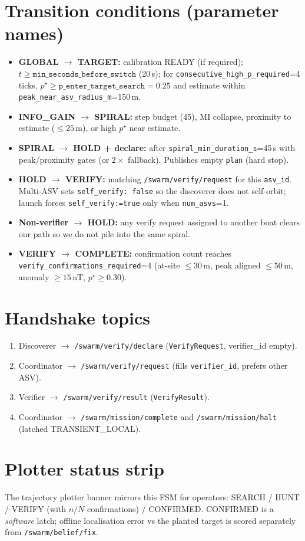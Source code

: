 \section{Transition conditions (parameter names)}
\begin{itemize}[leftmargin=*]
  \item \textbf{GLOBAL $\rightarrow$ TARGET:} calibration READY (if required);
        \(t\ge\texttt{min\_seconds\_before\_switch}\) (20\,s); for
        \texttt{consecutive\_high\_p\_required}=4 ticks,
        \(p^\star\ge\texttt{p\_enter\_target\_search}=0.25\) and estimate within
        \texttt{peak\_near\_asv\_radius\_m}=150\,m.
  \item \textbf{INFO\_GAIN $\rightarrow$ SPIRAL:} step budget (45), MI collapse,
        proximity to estimate (\(\le25\,\mathrm{m}\)), or high \(p^\star\) near estimate.
  \item \textbf{SPIRAL $\rightarrow$ HOLD + declare:} after
        \texttt{spiral\_min\_duration\_s}=45\,s with peak/proximity gates (or
        $2\times$ fallback). Publishes empty \texttt{plan} (hard stop).
  \item \textbf{HOLD $\rightarrow$ VERIFY:} matching
        \texttt{/swarm/verify/request} for this \texttt{asv\_id}. Multi-ASV sets
        \texttt{self\_verify: false} so the discoverer does not self-orbit;
        launch forces \texttt{self\_verify:=true} only when \texttt{num\_asvs}=1.
  \item \textbf{Non-verifier $\rightarrow$ HOLD:} any verify request assigned to
        another boat clears our path so we do not pile into the same spiral.
  \item \textbf{VERIFY $\rightarrow$ COMPLETE:} confirmation count reaches
        \texttt{verify\_confirmations\_required}=4
        (at-site \(\le30\,\mathrm{m}\), peak aligned \(\le50\,\mathrm{m}\),
        anomaly \(\ge15\,\mathrm{nT}\), \(p^\star\ge0.30\)).
\end{itemize}

\section{Handshake topics}
\begin{enumerate}[leftmargin=*]
  \item Discoverer $\rightarrow$ \texttt{/swarm/verify/declare}
        (\texttt{VerifyRequest}, verifier\_id empty).
  \item Coordinator $\rightarrow$ \texttt{/swarm/verify/request}
        (fills \texttt{verifier\_id}, prefers other ASV).
  \item Verifier $\rightarrow$ \texttt{/swarm/verify/result}
        (\texttt{VerifyResult}).
  \item Coordinator $\rightarrow$ \texttt{/swarm/mission/complete} and
        \texttt{/swarm/mission/halt} (latched TRANSIENT\_LOCAL).
\end{enumerate}

\section{Plotter status strip}
The trajectory plotter banner mirrors this FSM for operators:
SEARCH / HUNT / VERIFY (with \(n/N\) confirmations) / CONFIRMED.
CONFIRMED is a \emph{software} latch; offline localisation error vs the planted
target is scored separately from \texttt{/swarm/belief/fix}.

